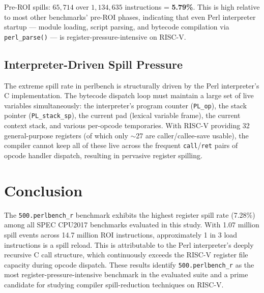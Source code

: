 \documentclass[conference]{IEEEtran}
\begin{document}
Pre-ROI spills: $65{,}714$ over $1{,}134{,}635$ instructions
= \textbf{5.79\%}. This is high relative to most other benchmarks'
pre-ROI phases, indicating that even Perl interpreter startup ---
module loading, script parsing, and bytecode compilation via
\texttt{perl\_parse()} --- is register-pressure-intensive on RISC-V.

\subsection{Interpreter-Driven Spill Pressure}

The extreme spill rate in perlbench is structurally driven by the
Perl interpreter's C implementation. The bytecode dispatch loop
must maintain a large set of live variables simultaneously:
the interpreter's program counter (\texttt{PL\_op}), the stack
pointer (\texttt{PL\_stack\_sp}), the current pad (lexical variable
frame), the current context stack, and various per-opcode temporaries.
With RISC-V providing 32 general-purpose registers (of which only
$\sim$27 are caller/callee-save usable), the compiler cannot keep
all of these live across the frequent \texttt{call}/\texttt{ret} pairs
of opcode handler dispatch, resulting in pervasive register spilling.

\section{Conclusion}

The \texttt{500.perlbench\_r} benchmark exhibits the highest register
spill rate (7.28\%) among all SPEC CPU2017 benchmarks evaluated in
this study. With 1.07 million spill events across 14.7 million ROI
instructions, approximately 1 in 3 load instructions is a spill reload.
This is attributable to the Perl interpreter's deeply recursive C call
structure, which continuously exceeds the RISC-V register file capacity
during opcode dispatch. These results identify
\texttt{500.perlbench\_r} as the most register-pressure-intensive
benchmark in the evaluated suite and a prime candidate for studying
compiler spill-reduction techniques on RISC-V.
\end{document}
